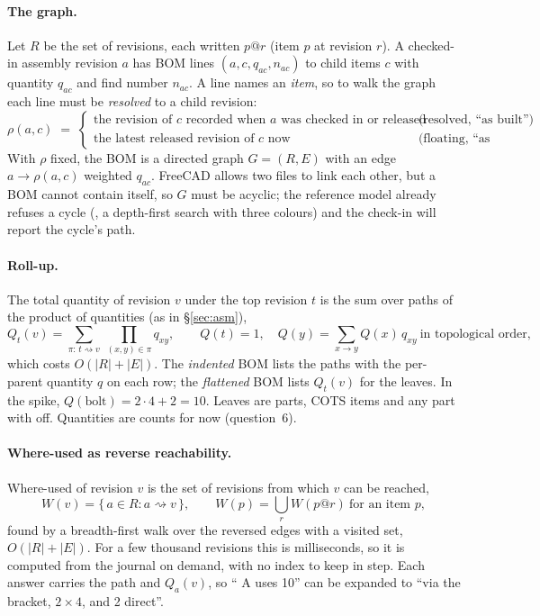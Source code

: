 \paragraph{The graph.} Let $R$ be the set of revisions, each written $p@r$ (item $p$ at revision $r$). A checked-in
assembly revision $a$ has BOM lines $(a, c, q_{ac}, n_{ac})$ to child items $c$ with quantity $q_{ac}$ and find number
$n_{ac}$. A line names an \emph{item}, so to walk the graph each line must be \emph{resolved} to a child revision:
\[
  \rho(a, c) \;=\;
  \begin{cases}
    \text{the revision of } c \text{ recorded when } a \text{ was checked in or released} & \text{(resolved, ``as built'')}\\
    \text{the latest released revision of } c \text{ now} & \text{(floating, ``as current'')}
  \end{cases}
\]
With $\rho$ fixed, the BOM is a directed graph $G = (R, E)$ with an edge $a \to \rho(a,c)$ weighted $q_{ac}$. FreeCAD
allows two files to link each other, but a BOM cannot contain itself, so $G$ must be acyclic; the reference model
already refuses a cycle (, a depth-first search with three colours) and the check-in will report the
cycle's path.

\paragraph{Roll-up.} The total quantity of revision $v$ under the top revision $t$ is the sum over paths of the product
of quantities (as in \S\ref{sec:asm}),
\[
  Q_t(v) = \sum_{\pi:\,t \rightsquigarrow v}\ \prod_{(x,y)\in\pi} q_{xy},
  \qquad
  Q(t)=1,\quad Q(y) = \sum_{x \to y} Q(x)\,q_{xy}\ \text{in topological order,}
\]
which costs $O(|R|+|E|)$. The \emph{indented} BOM lists the paths with the per-parent quantity $q$ on each row; the
\emph{flattened} BOM lists $Q_t(v)$ for the leaves. In the spike, $Q(\text{bolt}) = 2\cdot4 + 2 = 10$. Leaves are parts,
COTS items and any part with  off. Quantities are counts for now (question~6).

\paragraph{Where-used as reverse reachability.} Where-used of revision $v$ is the set of revisions from which $v$ can be
reached,
\[
  W(v) = \{\,a \in R : a \rightsquigarrow v\,\},
  \qquad
  W(p) = \bigcup_{r} W(p@r)\ \text{for an item } p,
\]
found by a breadth-first walk over the reversed edges with a visited set, $O(|R|+|E|)$. For a few thousand revisions
this is milliseconds, so it is computed from the journal on demand, with no index to keep in step. Each answer carries
the path and $Q_a(v)$, so `` A uses 10'' can be expanded to ``via the bracket, $2\times4$, and 2 direct''.

